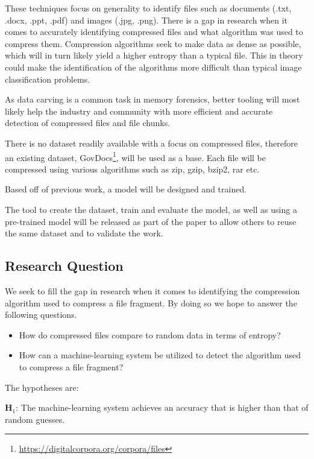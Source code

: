 \documentclass[conference]{IEEEtran}
\begin{document}
These techniques focus on generality to identify files such as documents (.txt, .docx, .ppt, .pdf) and images (.jpg, .png). There is a gap in research when it comes to accurately identifying compressed files and what algorithm was used to compress them. Compression algorithms seek to make data as dense as possible, which will in turn likely yield a higher entropy than a typical file. This in theory could make the identification of the algorithms more difficult than typical image classification problems\cite{PENROSE2013}.

As data carving is a common task in memory forensics, better tooling will most likely help the industry and community with more efficient and accurate detection of compressed files and file chunks.

There is no dataset readily available with a focus on compressed files, therefore an existing dataset, GovDocs\footnote{\href{https://digitalcorpora.org/corpora/files}{https://digitalcorpora.org/corpora/files}}, will be used as a base. Each file will be compressed using various algorithms such as zip, gzip, bzip2, rar etc.

Based off of previous work, a model will be designed and trained.

The tool to create the dataset, train and evaluate the model, as well as using a pre-trained model will be released as part of the paper to allow others to reuse the same dataset and to validate the work.

\subsection{Research Question}

We seek to fill the gap in research when it comes to identifying the compression algorithm used to compress a file fragment. By doing so we hope to answer the following questions.

\begin{itemize}
    \item How do compressed files compare to random data in terms of entropy?
    \item How can a machine-learning system be utilized to detect the algorithm used to compress a file fragment?
\end{itemize}

The hypotheses are:

\textbf{H$_1$}: The machine-learning system achieves an accuracy that is higher than that of random guesses.
\end{document}
